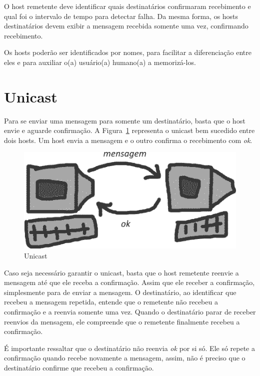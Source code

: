 \documentclass[12pt,twocolumn]{article}
\newcommand{\msg}[1]{\textsf{\textit{#1}}}
\begin{document}
				O host remetente deve identificar quais destinatários confirmaram recebimento e qual foi o intervalo de tempo para detectar falha. 
				Da mesma forma, os hosts destinatários devem exibir a mensagem recebida somente uma vez, confirmando recebimento.
				
				Os hosts poderão ser identificados por nomes, para facilitar a diferenciação entre eles e para auxiliar o(a) usuário(a) humano(a) a memorizá-los.							
						
		\section{Unicast}
		
			Para se enviar uma mensagem para somente um destinatário, basta que o host envie e aguarde confirmação.  
			A Figura~\ref{fig:unicast} representa o unicast bem sucedido entre dois hosts.
			Um host envia a mensagem e o outro confirma o recebimento com \msg{ok}.
			
			\begin{figure}[t]	%
				\centering
				\includegraphics[width=0.9\linewidth]{unicast.png}%
				\caption{Unicast}%
				\label{fig:unicast}				
			\end{figure}	
		
			Caso seja necessário garantir o unicast, basta que o host remetente reenvie a mensagem até que ele receba a confirmação.
			Assim que ele receber a confirmação, simplesmente para de enviar a mensagem.
			O destinatário, ao identificar que recebeu a mensagem repetida, entende que o remetente não recebeu a confirmação e a reenvia somente uma vez.
			Quando o destinatário parar de receber reenvios da mensagem, ele compreende que o remetente finalmente recebeu a confirmação.
			
			É importante ressaltar que o destinatário não reenvia \msg{ok} por si só. 
			Ele só repete a confirmação quando recebe novamente a mensagem, assim, não é preciso que o destinatário confirme que recebeu a confirmação.
			
\end{document}
